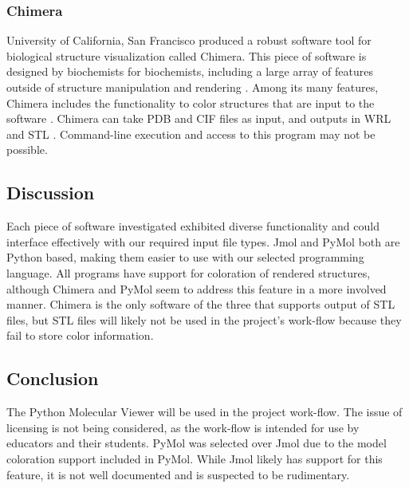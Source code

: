 \documentclass[letterpaper, onecolumn, draftclsnofoot, 10pt, compsoc]{IEEEtran}
\begin{document}
                \subsubsection{Chimera}
                        \begin{singlespace}
                        University of California, San Francisco produced a robust software tool for biological structure visualization called Chimera.
                        This piece of software is designed by biochemists for biochemists, including a large array of features outside of structure manipulation and rendering \cite{Chimera}.
                        Among its many features, Chimera includes the functionality to color structures that are input to the software \cite{chimeraColor}.
                        Chimera can take PDB and CIF files as input, and outputs in WRL and STL \cite{chimeraOut}.
                        Command-line execution and access to this program may not be possible.
                        \end{singlespace}
\subsection{Discussion}
                \begin{singlespace}
                Each piece of software investigated exhibited diverse functionality and could interface effectively with our required input file types.
                Jmol and PyMol both are Python based, making them easier to use with our selected programming language.
                All programs have support for coloration of rendered structures, although Chimera and PyMol seem to address this feature in a more involved manner.
                Chimera is the only software of the three that supports output of STL files, but STL files will likely not be used in the project's work-flow because they fail to store color information.
                \end{singlespace}
        \subsection{Conclusion}
                \begin{singlespace}
                The Python Molecular Viewer will be used in the project work-flow.
                The issue of licensing is not being considered, as the work-flow is intended for use by educators and their students.
                PyMol was selected over Jmol due to the model coloration support included in PyMol.
                While Jmol likely has support for this feature, it is not well documented and is suspected to be rudimentary.
                \end{singlespace}
\end{document}

